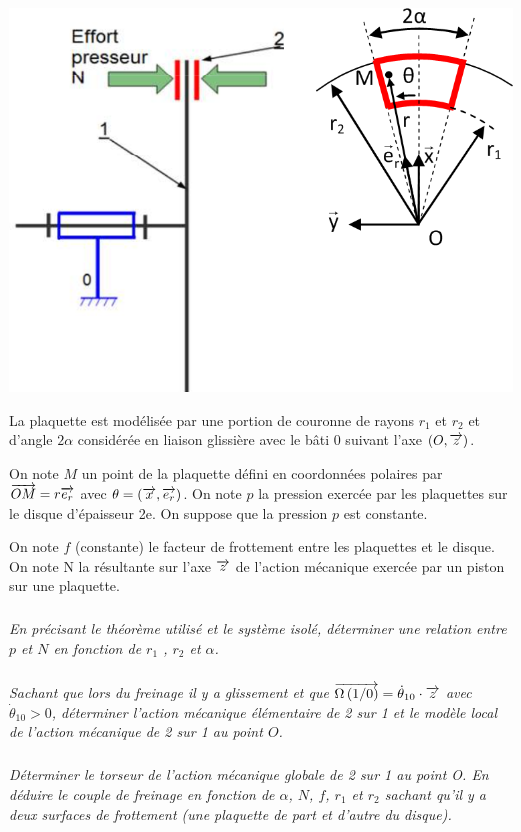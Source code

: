 \documentclass[10pt]{article}
\begin{document}
\begin{minipage}[c]{.4\linewidth}
\begin{center}
\includegraphics[width=\textwidth]{images/frein3}
\end{center}
\end{minipage} \hfill
\begin{minipage}[c]{.55\linewidth}
La plaquette est modélisée par une portion de couronne de rayons $r_1$ et $r_2$ et d'angle $2\alpha$ considérée en liaison glissière avec le bâti 0 suivant l’axe $(O,\overrightarrow{z})$. 

On note $M$ un point de la plaquette défini en coordonnées polaires par $\overrightarrow{OM}=r\overrightarrow{e_r}$
avec $\theta=\left(\overrightarrow{x},\overrightarrow{e_r}\right)$.
On note $p$ la pression exercée par les plaquettes sur le disque d’épaisseur 2e. On suppose que la pression $p$ est constante.  

On note $f$ (constante) le facteur de frottement entre les plaquettes et le disque.  On note N la résultante sur l’axe $\overrightarrow{z}$ de l'action mécanique exercée par un piston sur une plaquette. 
\end{minipage}



\subparagraph{}
\textit{En précisant le théorème utilisé et le système isolé, déterminer une relation entre $p$ et $N$ en fonction de $r_1$ , $r_2$  et $\alpha$. }

\subparagraph{}
\textit{Sachant que lors du freinage il y a glissement et que $\overrightarrow{\Omega\left( {1}/{0}\right)}=\dot{\theta}_{10}\cdot \overrightarrow{z}$ avec $\dot{\theta}_{10}>0$, déterminer l'action mécanique élémentaire de 2 sur 1 et le modèle local de l’action mécanique de 2 sur 1 au point $O$. }

\subparagraph{}
\textit{Déterminer le torseur de l'action mécanique globale de 2 sur 1 au point O. En déduire le couple de freinage en fonction de $\alpha$, $N$, $f$, $r_1$ et $r_2$ sachant qu'il y a deux surfaces de frottement (une plaquette de part et d'autre du disque). }
\end{document}

